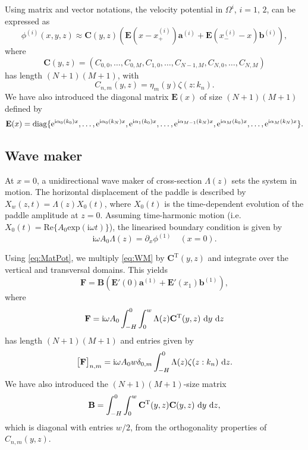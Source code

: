 \documentclass[12pt,a4paper]{article}
\newcommand{\real}{\textrm{Re}}
\newcommand{\wrt}{ ~ {\rm d}}
\def\ci{{\mathrm i}}
\renewcommand{\exp}{{\rm e}}
\newcommand{\ie}{i.e.\ }
\newcommand{\vp}{{\phi}}
\newcommand{\vm}{{\zeta}}
\newcommand{\ym}{{\eta}}
\newcommand{\kx}{\alpha}
\begin{document}
Using matrix and vector notations, the velocity potential in $\Omega^{i}$, $i=1,\,2$, can be expressed as
\begin{equation}
  \label{eq:MatPot}
 \vp^{(i)}(x,y,z) \approx \mathbf{C}(y,z)\left(\mathbf{E}(x-x^{(i)}_+)\mathbf{a}^{(i)} + 
 \mathbf{E}(x^{(i)}_--x)\mathbf{b}^{(i)}\right),
\end{equation}
where
\[
  \mathbf{C}(y,z) = \left(C_{0,0},\ldots,C_{0,M},C_{1,0},\ldots,C_{N-1,M},C_{N,0},\ldots,C_{N,M}\right)
\]
has length $(N+1)(M+1)$, with 
\[
  C_{n,m}(y,z) = \ym_{m}(y) \vm(z:k_{n}).
\]
We have also introduced the diagonal matrix $\mathbf{E}(x)$ of size $(N+1)(M+1)$ defined by
\[
  \mathbf{E}(x) = \mathrm{diag}\{\exp^{\ci\kx_{0}(k_{0})x},\ldots,\exp^{\ci\kx_{0}(k_{N})x},
  \exp^{\ci\kx_{1}(k_{0})x},\ldots,\exp^{\ci\kx_{M-1}(k_{N})x},\exp^{\ci\kx_{M}(k_{0})x},\ldots,
  \exp^{\ci\kx_{M}(k_{N})x}\}.
\]


\subsection{Wave maker}

At $x=0$, a unidirectional wave maker of cross-section $\Lambda(z)$ sets the system in motion. The 
horizontal displacement of the paddle is described by $X_w(z,t)=\Lambda(z)X_0(t)$, where $X_0(t)$ is the 
time-dependent evolution of the paddle amplitude at $z = 0$. Assuming time-harmonic motion (\ie 
$X_0(t) = \real\{A_0\mathrm{exp}(\ci\omega t)\}$), the linearised 
boundary condition is given by
\begin{equation}
  \label{eq:WM}
  \ci \omega A_0 \Lambda(z) = \partial_x \vp^{(1)} \quad (x=0).
\end{equation}

Using \eqref{eq:MatPot}, we multiply \eqref{eq:WM} by $\mathbf{C}^{\mathrm{T}}(y,z)$ and integrate over the 
vertical and transversal domains. This yields
\begin{equation}
  \label{eq:WM_proj}
  \mathbf{F} = \mathbf{B}\left(\mathbf{E}'(0)\mathbf{a}^{(1)} + \mathbf{E}'(x_1)\mathbf{b}^{(1)}\right),
\end{equation}
where
\[
  \mathbf{F} = \ci \omega A_0 \int_{-H}^0 \int_0^w \Lambda(z) \mathbf{C}^{\mathrm{T}}(y,z) \wrt y \wrt z
\]
has length $(N+1)(M+1)$ and entries given by 
\[
  \big[\mathbf{F}\big]_{n,m} = \ci \omega A_0 w \delta_{0,m} \int_{-H}^0 \Lambda(z) \vm(z:k_{n}) \wrt z.
\]
We have also introduced the $(N+1)(M+1)$-size matrix
\[
  \mathbf{B} = \int_{-H}^0 \int_0^w \mathbf{C}^{\mathrm{T}}(y,z) \mathbf{C}(y,z) \wrt y \wrt z,
\]
which is diagonal with entries $w/2$, from the orthogonality properties of $C_{n,m}(y,z)$.
\end{document}

